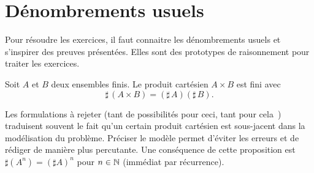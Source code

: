 \section{Dénombrements usuels}
Pour résoudre les exercices, il faut connaitre les dénombrements usuels et s'inspirer des preuves présentées. Elles sont des prototypes de raisonnement pour traiter les exercices.

\begin{propn}
 Soit $A$ et $B$ deux ensembles finis. Le produit cartésien $A\times B$ est fini avec
\begin{displaymath}
 \sharp\,(A\times B) = (\sharp\, A)(\sharp\, B).
\end{displaymath}
\end{propn}
\begin{rems}
 Les formulations à rejeter (\og tant de possibilités pour ceci, tant pour cela\fg~) traduisent souvent le fait qu'un certain produit cartésien est sous-jacent dans la modélisation du problème. Préciser le modèle permet d'éviter les erreurs et de rédiger de manière plus percutante. \newline
 Une conséquence de cette proposition est $\sharp(A^n) = (\sharp A)^n$ pour $n\in \mathbb{N}$ (immédiat par récurrence).
\end{rems}

